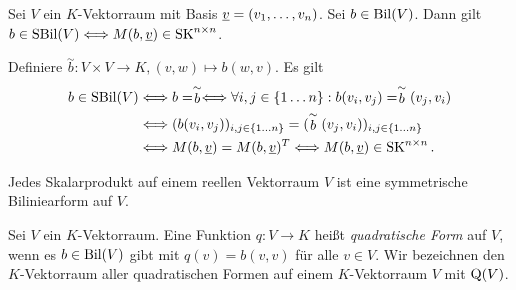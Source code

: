 \documentclass[../../main.tex]{subfiles}
\begin{document}
\begin{pro}\label{13.4.3}
Sei $V$ ein $K$-Vektorraum mit Basis ${\underline v}=(v_1,\ldots ,v_n)$. Sei $b\in \operatorname{Bil}(V)$. Dann gilt $b\in \operatorname{SBil}(V)\Longleftrightarrow M(b,\underline{v})\in\operatorname{SK}^{n\times n}$.
\end{pro}
\begin{cproof}
Definiere $\stackrel{\sim}{b}: V\times V\to K, (v,w)\mapsto b(w,v)$. Es gilt
\begin{align*}
b\in\operatorname{SBil}(V)&\Longleftrightarrow b=\stackrel{\sim}{b}\Longleftrightarrow \forall i,j\in\{1\ldots n\}: b(v_i,v_j)=\stackrel{\sim}{b}(v_j,v_i)\\
&\Longleftrightarrow (b(v_i,v_j))_{i,j\in\{1\ldots n\}}=(\stackrel{\sim}{b}(v_j,v_i))_{i,j\in\{1\ldots n\}}\\
&\Longleftrightarrow M(b,{\underline v})=M(b,{\underline v})^T\Longleftrightarrow M(b,{\underline v})\in\operatorname{SK}^{n\times n}.
\end{align*}
\end{cproof}

\begin{bsp}\label{13.4.4}
Jedes Skalarprodukt auf einem reellen Vektorraum $V$ ist eine symmetrische Biliniearform auf $V$.
\end{bsp}
	
\begin{df}\label{13.4.5} 
Sei $V$ ein $K$-Vektorraum. Eine Funktion $q: V\to K$ heißt  \emph{quadratische Form} auf $V$, wenn es $b\in \operatorname{Bil}(V)$ gibt mit $q(v)=b(v,v)$ für alle $v\in V$. Wir bezeichnen den $K$-Vektorraum aller quadratischen Formen auf einem $K$-Vektorraum $V$ mit $\operatorname{Q}(V)$.
\end{df}
\end{document}
